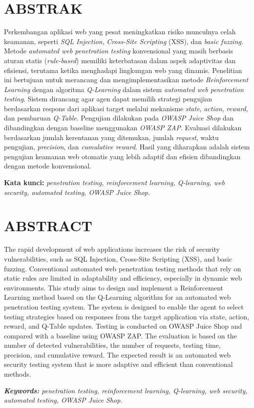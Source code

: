 \chapter*{ABSTRAK}

Perkembangan aplikasi web yang pesat meningkatkan risiko munculnya celah keamanan, seperti \textit{SQL Injection}, \textit{Cross-Site Scripting} (XSS), dan \textit{basic fuzzing}. Metode \textit{automated web penetration testing} konvensional yang masih berbasis aturan statis (\textit{rule-based}) memiliki keterbatasan dalam aspek adaptivitas dan efisiensi, terutama ketika menghadapi lingkungan web yang dinamis. Penelitian ini bertujuan untuk merancang dan mengimplementasikan metode \textit{Reinforcement Learning} dengan algoritma \textit{Q-Learning} dalam sistem \textit{automated web penetration testing}. Sistem dirancang agar agen dapat memilih strategi pengujian berdasarkan respons dari aplikasi target melalui mekanisme \textit{state}, \textit{action}, \textit{reward}, dan pembaruan \textit{Q-Table}. Pengujian dilakukan pada \textit{OWASP Juice Shop} dan dibandingkan dengan baseline menggunakan \textit{OWASP ZAP}. Evaluasi dilakukan berdasarkan jumlah kerentanan yang ditemukan, jumlah \textit{request}, waktu pengujian, \textit{precision}, dan \textit{cumulative reward}. Hasil yang diharapkan adalah sistem pengujian keamanan web otomatis yang lebih adaptif dan efisien dibandingkan dengan metode konvensional.

\textbf{Kata kunci:} \textit{penetration testing, reinforcement learning, Q-learning, web security, automated testing, OWASP Juice Shop.}
\clearpage


\chapter*{ABSTRACT}

The rapid development of web applications increases the risk of security vulnerabilities, such as SQL Injection, Cross-Site Scripting (XSS), and basic fuzzing. Conventional automated web penetration testing methods that rely on static rules are limited in adaptability and efficiency, especially in dynamic web environments. This study aims to design and implement a Reinforcement Learning method based on the Q-Learning algorithm for an automated web penetration testing system. The system is designed to enable the agent to select testing strategies based on responses from the target application via state, action, reward, and Q-Table updates. Testing is conducted on OWASP Juice Shop and compared with a baseline using OWASP ZAP. The evaluation is based on the number of detected vulnerabilities, the number of requests, testing time, precision, and cumulative reward. The expected result is an automated web security testing system that is more adaptive and efficient than conventional methods.

\textit{\textbf{Keywords:} penetration testing, reinforcement learning, Q-learning, web security, automated testing, OWASP Juice Shop.}
\clearpage